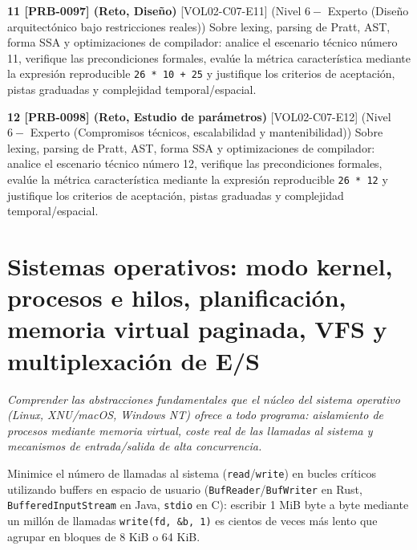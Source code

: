 \documentclass{book}
\begin{document}
\begin{tcolorbox}[title={Ejercicios}, studiumworked, breakable]
\noindent\textbf{11 [PRB-0097] (Reto, Diseño)}
[VOL02-C07-E11] (Nivel \(6 -\) Experto (Diseño arquitectónico bajo restricciones reales)) Sobre lexing, parsing de Pratt, AST, forma SSA y optimizaciones de compilador: analice el escenario técnico número 11, verifique las precondiciones formales, evalúe la métrica característica mediante la expresión reproducible \texttt{26 * 10 + 25} y justifique los criterios de aceptación, pistas graduadas y complejidad temporal/espacial.

\noindent\textbf{12 [PRB-0098] (Reto, Estudio de parámetros)}
[VOL02-C07-E12] (Nivel \(6 -\) Experto (Compromisos técnicos, escalabilidad y mantenibilidad)) Sobre lexing, parsing de Pratt, AST, forma SSA y optimizaciones de compilador: analice el escenario técnico número 12, verifique las precondiciones formales, evalúe la métrica característica mediante la expresión reproducible \texttt{26 * 12} y justifique los criterios de aceptación, pistas graduadas y complejidad temporal/espacial.
\end{tcolorbox}

\chapter{Sistemas operativos: modo kernel, procesos e hilos, planificación, memoria virtual paginada, VFS y multiplexación de E/S}
\label{chap:cap08-sistemas-operativos-procesos-memoria-virtual-io}

\noindent\textit{Comprender las abstracciones fundamentales que el núcleo del sistema operativo (Linux, XNU/macOS, Windows NT) ofrece a todo programa: aislamiento de procesos mediante memoria virtual, coste real de las llamadas al sistema y mecanismos de entrada/salida de alta concurrencia.}

\begin{tcolorbox}[title={Consejo}, studiumtip, breakable]

Minimice el número de llamadas al sistema (\texttt{read}/\texttt{write}) en bucles críticos utilizando buffers en espacio de usuario (\texttt{BufReader}/\texttt{BufWriter} en Rust, \texttt{BufferedInputStream} en Java, \texttt{stdio} en C): escribir 1 MiB byte a byte mediante un millón de llamadas \texttt{write(fd, \&b, 1)} es cientos de veces más lento que agrupar en bloques de 8 KiB o 64 KiB.
\end{tcolorbox}
\end{document}
